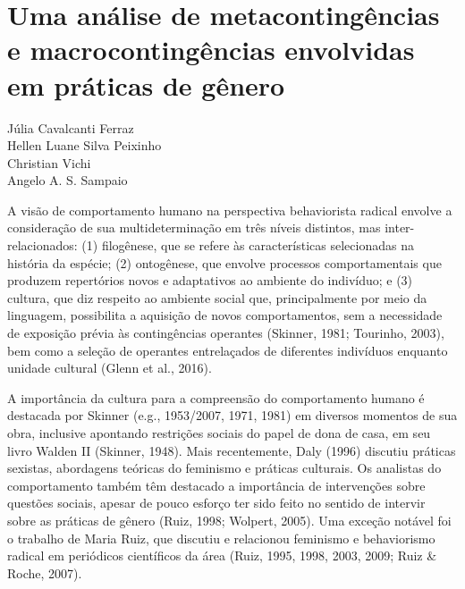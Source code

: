 \setcounter{footnote}{0}
\setcounter{figure}{0}
\setcounter{table}{0}
\chapter*{Uma análise de metacontingências e macrocontingências envolvidas em práticas de gênero}
\begin{flushright}
\begin{small}
    Júlia Cavalcanti Ferraz\\
    Hellen Luane Silva Peixinho\\
    Christian Vichi\\
    Angelo A. S. Sampaio\\
\end{small}
\vspace{1cm}
\end{flushright}

A visão de comportamento humano na perspectiva behaviorista radical envolve a consideração de sua multideterminação em três níveis distintos, mas inter-relacionados: (1) filogênese, que se refere às características selecionadas na história da espécie; (2) ontogênese, que envolve processos comportamentais que produzem repertórios novos e adaptativos ao ambiente do indivíduo; e (3) cultura, que diz respeito ao ambiente social que, principalmente por meio da linguagem, possibilita a aquisição de novos comportamentos, sem a necessidade de exposição prévia às contingências operantes (Skinner, 1981; Tourinho, 2003), bem como a seleção de operantes entrelaçados de diferentes indivíduos enquanto unidade cultural (Glenn et al., 2016).

A importância da cultura para a compreensão do comportamento humano é destacada por Skinner (e.g., 1953/2007, 1971, 1981) em diversos momentos de sua obra, inclusive apontando restrições sociais do papel de dona de casa, em seu livro Walden II (Skinner, 1948). Mais recentemente, Daly (1996) discutiu práticas sexistas, abordagens teóricas do feminismo e práticas culturais. Os analistas do comportamento também têm destacado a importância de intervenções sobre questões sociais, apesar de pouco esforço ter sido feito no sentido de intervir sobre as práticas de gênero (Ruiz, 1998; Wolpert, 2005). Uma exceção notável foi o trabalho de Maria Ruiz, que discutiu e relacionou feminismo e behaviorismo radical em periódicos científicos da área (Ruiz, 1995, 1998, 2003, 2009; Ruiz \& Roche, 2007).

